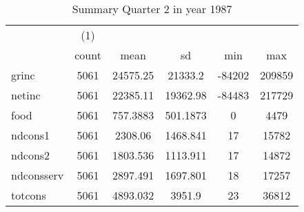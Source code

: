\begin{table}[htbp]\centering
\def\sym#1{\ifmmode^{#1}\else\(^{#1}\)\fi}
\caption{Summary Quarter 2 in year 1987 \label{sum\_Q2\_y1987}}
\begin{tabular}{l*{1}{ccccc}}
\hline\hline
            &\multicolumn{1}{c}{(1)}&            &            &            &            \\
            &       count&        mean&          sd&         min&         max\\
\hline
grinc       &        5061&    24575.25&     21333.2&      -84202&      209859\\
netinc      &        5061&    22385.11&    19362.98&      -84483&      217729\\
food        &        5061&    757.3883&    501.1873&           0&        4479\\
ndcons1     &        5061&     2308.06&    1468.841&          17&       15782\\
ndcons2     &        5061&    1803.536&    1113.911&          17&       14872\\
ndconsserv  &        5061&    2897.491&    1697.801&          18&       17257\\
totcons     &        5061&    4893.032&      3951.9&          23&       36812\\
\hline\hline
\end{tabular}
\end{table}
